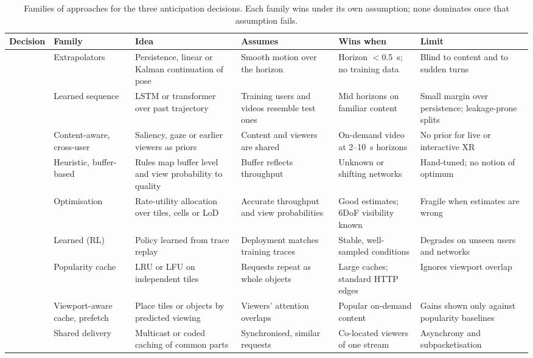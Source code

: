 \begin{table}[t]
\centering\small
\caption{Families of approaches for the three anticipation decisions. Each family wins under its own assumption; none dominates once that assumption fails.}
\label{tab:anticipate-families}
\setlength{\tabcolsep}{3pt}
\renewcommand{\arraystretch}{1.05}
\begin{tabularx}{\linewidth}{@{}>{\raggedright\arraybackslash}p{1.3cm}>{\raggedright\arraybackslash}p{2.05cm}>{\raggedright\arraybackslash}X>{\raggedright\arraybackslash}X>{\raggedright\arraybackslash}X>{\raggedright\arraybackslash}X@{}}
\toprule
Decision & Family & Idea & Assumes & Wins when & Limit\\
\midrule
\multirow{3}{=}{Predict} & Extrapolators & Persistence, linear or Kalman continuation of pose & Smooth motion over the horizon & Horizon $<$0.5~s; no training data & Blind to content and to sudden turns\\
\addlinespace[2pt]
 & Learned sequence & LSTM or transformer over past trajectory & Training users and videos resemble test ones & Mid horizons on familiar content & Small margin over persistence; leakage-prone splits\\
\addlinespace[2pt]
 & Content-aware, cross-user & Saliency, gaze or earlier viewers as priors & Content and viewers are shared & On-demand video at 2--10~s horizons & No prior for live or interactive XR\\
\midrule
\multirow{3}{=}{Fetch} & Heuristic, buffer-based & Rules map buffer level and view probability to quality & Buffer reflects throughput & Unknown or shifting networks & Hand-tuned; no notion of optimum\\
\addlinespace[2pt]
 & Optimisation & Rate-utility allocation over tiles, cells or LoD & Accurate throughput and view probabilities & Good estimates; 6DoF visibility known & Fragile when estimates are wrong\\
\addlinespace[2pt]
 & Learned (RL) & Policy learned from trace replay & Deployment matches training traces & Stable, well-sampled conditions & Degrades on unseen users and networks\\
\midrule
\multirow{3}{=}{Keep} & Popularity cache & LRU or LFU on independent tiles & Requests repeat as whole objects & Large caches; standard HTTP edges & Ignores viewport overlap\\
\addlinespace[2pt]
 & Viewport-aware cache, prefetch & Place tiles or objects by predicted viewing & Viewers' attention overlaps & Popular on-demand content & Gains shown only against popularity baselines\\
\addlinespace[2pt]
 & Shared delivery & Multicast or coded caching of common parts & Synchronised, similar requests & Co-located viewers of one stream & Asynchrony and subpacketisation\\
\bottomrule
\end{tabularx}
\end{table}

